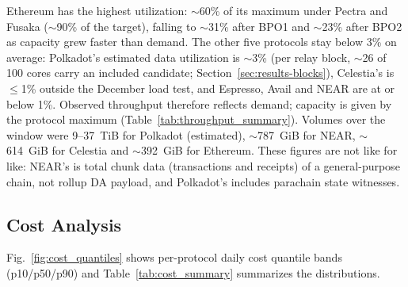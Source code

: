 Ethereum has the highest utilization: $\sim$60\% of its maximum under Pectra and Fusaka ($\sim$90\% of the target), falling to $\sim$31\% after BPO1 and $\sim$23\% after BPO2 as capacity grew faster than demand.
The other five protocols stay below 3\% on average: Polkadot's estimated data utilization is $\sim$3\% (per relay block, $\sim$26 of 100 cores carry an included candidate; Section~\ref{sec:results-blocks}), Celestia's is $\le$1\% outside the December load test, and Espresso, Avail and NEAR are at or below 1\%.
Observed throughput therefore reflects demand; capacity is given by the protocol maximum (Table~\ref{tab:throughput_summary}).
Volumes over the window were 9--37~TiB for Polkadot (estimated), $\sim$787~GiB for NEAR, $\sim$614~GiB for Celestia and $\sim$392~GiB for Ethereum. These figures are not like for like: NEAR's is total chunk data (transactions and receipts) of a general-purpose chain, not rollup DA payload, and Polkadot's includes parachain state witnesses.

\subsection{Cost Analysis}
\label{sec:results-cost}

Fig.~\ref{fig:cost_quantiles} shows per-protocol daily cost quantile bands (p10/p50/p90) and Table~\ref{tab:cost_summary} summarizes the distributions.

